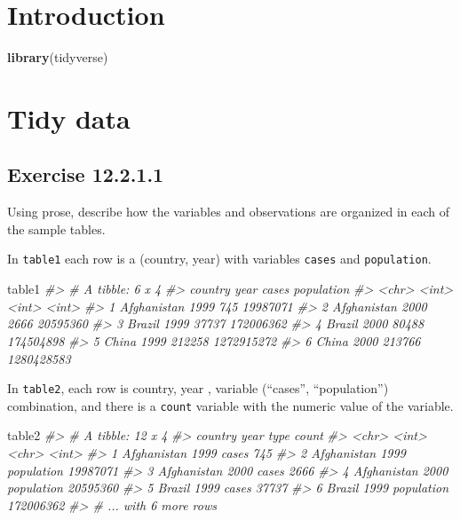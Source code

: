 \documentclass[]{book}
\newenvironment{Shaded}{\begin{snugshade}}{\end{snugshade}}
\newcommand{\CommentTok}[1]{\textcolor[rgb]{0.56,0.35,0.01}{\textit{#1}}}
\newcommand{\KeywordTok}[1]{\textcolor[rgb]{0.13,0.29,0.53}{\textbf{#1}}}
\newcommand{\NormalTok}[1]{#1}
\theoremstyle{plain}
\theoremstyle{remark}
\begin{document}
\hypertarget{introduction-7}{%
\section{Introduction}\label{introduction-7}}

\begin{Shaded}
\begin{Highlighting}[]
\KeywordTok{library}\NormalTok{(tidyverse)}
\end{Highlighting}
\end{Shaded}

\hypertarget{tidy-data-1}{%
\section{Tidy data}\label{tidy-data-1}}

\hypertarget{exercise-12.2.1.1}{%
\subsection*{\texorpdfstring{Exercise
{12.2.1.1}}{Exercise 12.2.1.1}}\label{exercise-12.2.1.1}}

Using prose, describe how the variables and observations are organized
in each of the sample tables.

In \texttt{table1} each row is a (country, year) with variables
\texttt{cases} and \texttt{population}.

\begin{Shaded}
\begin{Highlighting}[]
\NormalTok{table1}
\CommentTok{#> # A tibble: 6 x 4}
\CommentTok{#>   country      year  cases population}
\CommentTok{#>   <chr>       <int>  <int>      <int>}
\CommentTok{#> 1 Afghanistan  1999    745   19987071}
\CommentTok{#> 2 Afghanistan  2000   2666   20595360}
\CommentTok{#> 3 Brazil       1999  37737  172006362}
\CommentTok{#> 4 Brazil       2000  80488  174504898}
\CommentTok{#> 5 China        1999 212258 1272915272}
\CommentTok{#> 6 China        2000 213766 1280428583}
\end{Highlighting}
\end{Shaded}

In \texttt{table2}, each row is country, year , variable (``cases'',
``population'') combination, and there is a \texttt{count} variable with
the numeric value of the variable.

\begin{Shaded}
\begin{Highlighting}[]
\NormalTok{table2}
\CommentTok{#> # A tibble: 12 x 4}
\CommentTok{#>   country      year type           count}
\CommentTok{#>   <chr>       <int> <chr>          <int>}
\CommentTok{#> 1 Afghanistan  1999 cases            745}
\CommentTok{#> 2 Afghanistan  1999 population  19987071}
\CommentTok{#> 3 Afghanistan  2000 cases           2666}
\CommentTok{#> 4 Afghanistan  2000 population  20595360}
\CommentTok{#> 5 Brazil       1999 cases          37737}
\CommentTok{#> 6 Brazil       1999 population 172006362}
\CommentTok{#> # ... with 6 more rows}
\end{Highlighting}
\end{Shaded}
\end{document}
